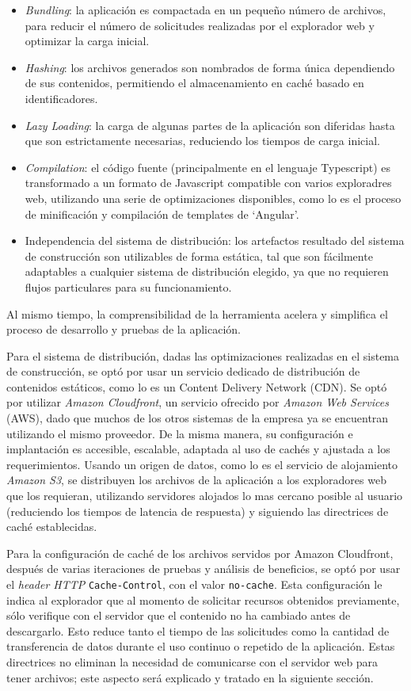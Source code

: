 \begin{itemize}
  \item \textit{Bundling}: la aplicación es compactada en un pequeño número de archivos, para reducir el número de solicitudes realizadas por el explorador web y optimizar la carga inicial.
  \item \textit{Hashing}: los archivos generados son nombrados de forma única dependiendo de sus contenidos, permitiendo el almacenamiento en caché basado en identificadores.
  \item \textit{Lazy Loading}: la carga de algunas partes de la aplicación son diferidas hasta que son estrictamente necesarias, reduciendo los tiempos de carga inicial.
  \item \textit{Compilation}: el código fuente (principalmente en el lenguaje Typescript) es transformado a un formato de Javascript compatible con varios exploradres web, utilizando una serie de optimizaciones disponibles, como lo es el proceso de minificación y compilación de templates de `Angular'.
  \item Independencia del sistema de distribución: los artefactos resultado del sistema de construcción son utilizables de forma estática, tal que son fácilmente adaptables a cualquier sistema de distribución elegido, ya que no requieren flujos particulares para su funcionamiento.
\end{itemize}

Al mismo tiempo, la comprensibilidad de la herramienta acelera y simplifica el proceso de desarrollo y pruebas de la aplicación.

Para el sistema de distribución, dadas las optimizaciones realizadas en el sistema de construcción, se optó por usar un servicio dedicado de distribución de contenidos estáticos, como lo es un Content Delivery Network (CDN). Se optó por utilizar \textit{Amazon Cloudfront}, un servicio ofrecido por \textit{Amazon Web Services} (AWS), dado que muchos de los otros sistemas de la empresa ya se encuentran utilizando el mismo proveedor. De la misma manera, su configuración e implantación es accesible, escalable, adaptada al uso de cachés y ajustada a los requerimientos. Usando un origen de datos, como lo es el servicio de alojamiento \textit{Amazon S3}, se distribuyen los archivos de la aplicación a los exploradores web que los requieran, utilizando servidores alojados lo mas cercano posible al usuario (reduciendo los tiempos de latencia de respuesta) y siguiendo las directrices de caché establecidas.

Para la configuración de caché de los archivos servidos por Amazon Cloudfront, después de varias iteraciones de pruebas y análisis de beneficios, se optó por usar el \textit{header HTTP} \texttt{Cache-Control}, con el valor \texttt{no-cache}. Esta configuración le indica al explorador que al momento de solicitar recursos obtenidos previamente, sólo verifique con el servidor que el contenido no ha cambiado antes de descargarlo. Esto reduce tanto el tiempo de las solicitudes como la cantidad de transferencia de datos durante el uso continuo o repetido de la aplicación. Estas directrices no eliminan la necesidad de comunicarse con el servidor web para tener archivos; este aspecto será explicado y tratado en la siguiente sección.

